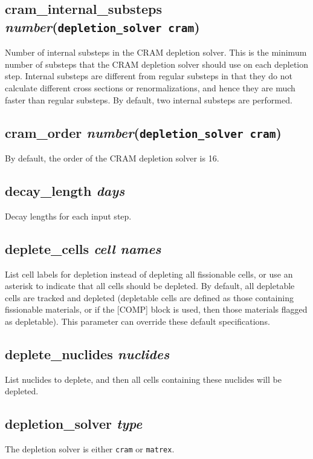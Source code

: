 \documentclass[10pt]{article}
\begin{document}
\subsection{cram\_internal\_substeps \textit{number}\quad\quad\quad(\texttt{depletion\_solver cram})}
Number of internal substeps in the CRAM depletion solver. This is the minimum number of substeps that the CRAM depletion solver should use on each depletion step. Internal substeps are different from regular substeps in that they do not calculate different cross sections or renormalizations, and hence they are much faster than regular substeps. By default, two internal substeps are performed.

\subsection{cram\_order \textit{number}\quad\quad\quad(\texttt{depletion\_solver cram})}
By default, the order of the CRAM depletion solver is 16. 

\subsection{decay\_length \textit{days}}
Decay lengths for each input step.

\subsection{deplete\_cells \textit{cell names}}
List cell labels for depletion instead of depleting all fissionable cells, or use an asterisk to indicate that all cells should be depleted. By default, all depletable cells are tracked and depleted (depletable cells are defined as those containing fissionable materials, or if the [COMP] block is used, then those materials flagged as depletable). This parameter can override these default specifications.

\subsection{deplete\_nuclides \textit{nuclides}}
List nuclides to deplete, and then all cells containing these nuclides will be depleted. 

\subsection{depletion\_solver \textit{type}}
The depletion solver is either \texttt{cram} or \texttt{matrex}. 
\end{document}
